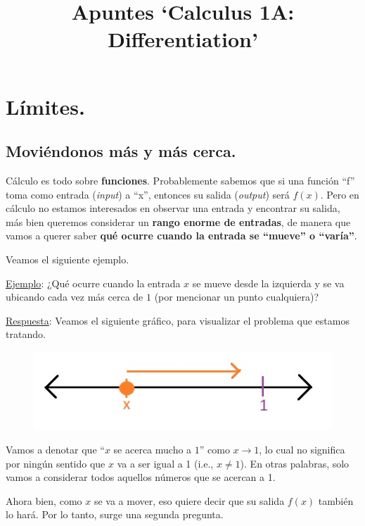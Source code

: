 \documentclass[12pt]{article}
\begin{document}
\title{Apuntes `Calculus 1A: Differentiation'}
\author{}
\date{}
\maketitle

\tableofcontents

\newpage

\section{Límites.}


\subsection{Moviéndonos más y más cerca.}

Cálculo es todo sobre \textbf{funciones}. Probablemente sabemos que si una función ``f'' toma como entrada (\textit{input}) a ``x'', entonces su salida (\textit{output}) será $f(x)$. Pero en cálculo no estamos interesados en observar una entrada y encontrar su salida, más bien queremos considerar un \textbf{rango enorme de entradas}, de manera que vamos a querer saber \textbf{qué ocurre cuando la entrada se ``mueve'' o ``varía''}.

Veamos el siguiente ejemplo.

\underline{Ejemplo}: ¿Qué ocurre cuando la entrada $x$ se mueve desde la izquierda y se va ubicando cada vez más cerca de $1$ (por mencionar un punto cualquiera)?

\underline{Respuesta}: Veamos el siguiente gráfico, para visualizar el problema que estamos tratando.

\begin{figure}[hbt!]
\centering
\includegraphics[scale=0.7]{img/moving_point.jpg}
\end{figure}

Vamos a denotar que ``$x$ se acerca mucho a $1$'' como $x \to 1$, lo cual no significa por ningún sentido que $x$ va a ser igual a 1 (i.e., $x \neq 1$). En otras palabras, solo vamos a considerar todos aquellos números que se acercan a 1.

Ahora bien, como $x$ se va a mover, eso quiere decir que su salida $f(x)$ también lo hará. Por lo tanto, surge una segunda pregunta.
\end{document}
